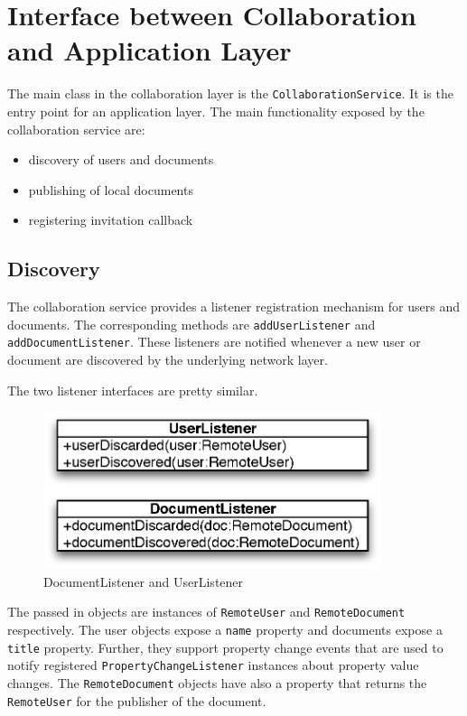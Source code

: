 
\section{Interface between Collaboration and Application Layer}
The main class in the collaboration layer is the \texttt{CollaborationService}.
It is the entry point for an application layer. The main functionality 
exposed by the collaboration service are:
\begin{itemize}
 \item discovery of users and documents
 \item publishing of local documents
 \item registering invitation callback
\end{itemize}

\subsection{Discovery}
The collaboration service provides a listener registration mechanism for
users and documents. The corresponding methods are \texttt{addUserListener}
and \texttt{addDocumentListener}. These listeners are notified whenever a
new user or document are discovered by the underlying network layer.

The two listener interfaces are pretty similar. 
\begin{figure}[H]
 \centering
 \includegraphics[width=9.9cm,height=4.6cm]{../images/design/discovery-listener.eps}
 \caption{DocumentListener and UserListener}
\end{figure}

The passed in objects are instances of \texttt{RemoteUser} and
\texttt{RemoteDocument} respectively. The user objects expose a \texttt{name}
property and documents expose a \texttt{title} property. Further, they support
property change events that are used to notify registered 
\texttt{PropertyChangeListener} instances about property value changes. The
\texttt{RemoteDocument} objects have also a property that returns the
\texttt{RemoteUser} for the publisher of the document.

